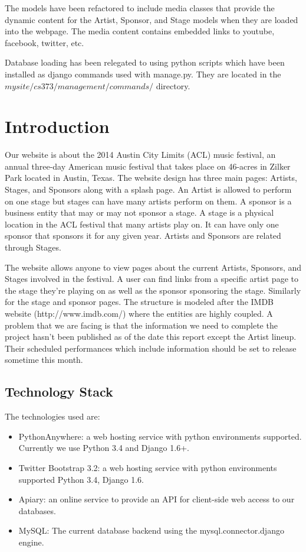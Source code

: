 \documentclass[12pt,english]{scrartcl}
\begin{document}
The models have been refactored to include media classes that provide the dynamic content for the Artist,
Sponsor, and Stage models when they are loaded into the webpage. The media content contains embedded links to youtube, facebook, twitter, etc. 

Database loading has been relegated to using
python scripts which have been installed as django commands used with manage.py. They are located in the $mysite/cs373/management/commands/$ directory.

\section{Introduction}
Our website is about the 2014 Austin City Limits (ACL) music festival, an annual three-day American music festival that takes place on 46-acres in Zilker Park located in Austin, Texas. 
The website design has three main pages: Artists, Stages, and Sponsors along with a splash page. An Artist is allowed to perform on one stage but stages can have many artists perform on them.
A sponsor is a business entity that may or may not sponsor a stage. A stage is a physical location in the ACL festival that many artists play on. 
It can have only one sponsor that sponsors it for any given year. Artists and Sponsors are related through Stages.

The website allows anyone to view pages about the current Artists, Sponsors, and Stages involved in the festival. A user can find links from a specific artist page to the stage they're playing on
as well as the sponsor sponsoring the stage. Similarly for the stage and sponsor pages. The structure is modeled after the IMDB website (http://www.imdb.com/) where the entities are highly coupled.
A problem that we are facing is that the information we need to complete the project hasn't been published as of the date this report except the Artist lineup. Their scheduled performances which 
include information should be set to release sometime this month.

\subsection{Technology Stack}
The technologies used are:
\begin{itemize}
 \item PythonAnywhere: a web hosting service with python environments supported. Currently we use Python 3.4 and Django 1.6+.
\end{itemize}
\begin{itemize}
 \item Twitter Bootstrap 3.2: a web hosting service with python environments supported Python 3.4, Django 1.6.
\end{itemize}
\begin{itemize}
 \item Apiary: an online service to provide an API for client-side web access to our databases.
\end{itemize}
\begin{itemize}
 \item MySQL: The current database backend using the mysql.connector.django engine.
\end{itemize}
\end{document}
